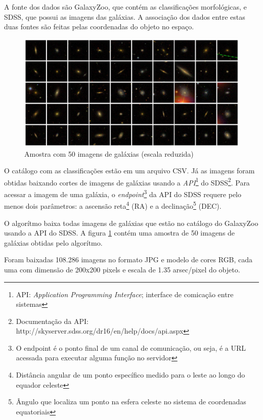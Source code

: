 A fonte dos dados são GalaxyZoo, que contém as classificações morfológicas, e SDSS, que possui as imagens das galáxias. A associação dos dados entre estas duas fontes são feitas pelas coordenadas do objeto no espaço.

\begin{figure}[h!]
  \centering
  \includegraphics[width=\textwidth]{figures/galaxy_grid.jpg}
  \caption{Amostra com 50 imagens de galáxias (escala reduzida)}
  \label{fig:galaxy_grid}
\end{figure}

O catálogo com as classificações estão em um arquivo CSV. Já as imagens foram obtidas baixando cortes de imagens de galáxias usando a \emph{API}\footnote{API: \emph{Application Programming Interface}; interface de comicação entre sistemas} do SDSS\footnote{Documentação da API: http://skyserver.sdss.org/dr16/en/help/docs/api.aspx}. Para acessar a imagem de uma galáxia, o \emph{endpoint}\footnote{O endpoint é o ponto final de um canal de comunicação, ou seja, é a URL acessada para executar alguma função no servidor} da API do SDSS requere pelo menos dois parâmetros: a ascensão reta\footnote{Distância angular de um ponto específico medido para o leste ao longo do equador celeste} (RA) e a declinação\footnote{Ângulo que localiza um ponto na esfera celeste no sistema de coordenadas equatoriais} (DEC).

O algorítmo baixa todas imagens de galáxias que estão no catálogo do GalaxyZoo usando a API do SDSS. A figura \ref{fig:galaxy_grid} contém uma amostra de 50 imagens de galáxias obtidas pelo algorítmo.

Foram baixadas 108.286 imagens no formato JPG e modelo de cores RGB, cada uma com dimensão de 200x200 pixels e escala de 1.35 arsec/pixel do objeto.

